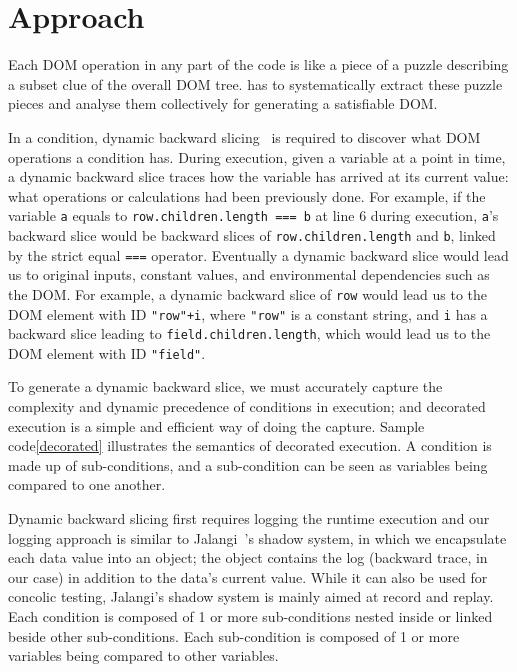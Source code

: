 \section{Approach}
Each DOM operation in any part of the code is like a piece of a puzzle describing a subset clue of the overall DOM tree.  \tool has to systematically extract these puzzle pieces and analyse them collectively for generating a satisfiable DOM.  


In a condition, dynamic backward slicing~\cite{} is required to discover what DOM operations a condition has.  
During execution, given a variable at a point in time, a dynamic backward slice traces how the variable has arrived at its current value: what operations or calculations had been previously done.  
For example, if the variable {\tt a} equals to {\tt row.children.length === b} at line 6 during execution, {\tt a}'s backward slice would be backward slices of {\tt row.children.length} and {\tt b}, linked by the strict equal {\tt ===} operator.  
Eventually a dynamic backward slice would lead us to original inputs, constant values, and environmental dependencies such as the DOM.  
For example, a dynamic backward slice of {\tt row} would lead us to the DOM element with ID {\tt "row"+i}, where {\tt "row"} is a constant string, and {\tt i} has a backward slice leading to {\tt field.children.length}, which would lead us to the DOM element with ID {\tt "field"}.

To generate a dynamic backward slice, we must accurately capture the complexity and dynamic precedence of conditions in execution; and decorated execution is a simple and efficient way of doing the capture.  
Sample code\ref{decorated} illustrates the semantics of decorated execution.  
A condition is made up of sub-conditions, and a sub-condition can be seen as variables being compared to one another.  



Dynamic backward slicing first requires logging the runtime execution and our logging approach is similar to Jalangi~\cite{jalangi}'s shadow system, in which we encapsulate each data value into an object; the object contains the log (backward trace, in our case) in addition to the data’s current value. While it can also be used for concolic testing, Jalangi’s shadow system is mainly aimed at record and replay.  
Each condition is composed of 1 or more sub-conditions nested inside or linked beside other sub-conditions.  Each sub-condition is composed of 1 or more variables being compared to other variables.  

